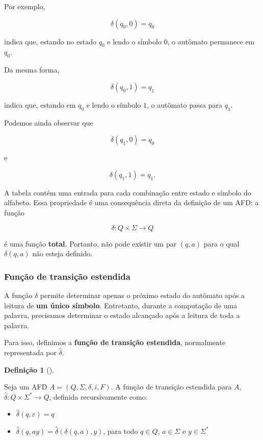 \documentclass[
  brazilian,
  letterpaper,
]{book}
\theoremstyle{plain}
\theoremstyle{definition}
\newtheorem{definition}{Definição}[chapter]
\theoremstyle{remark}
\begin{document}
Por exemplo,

\[
\delta(q_0,0)=q_0
\]

indica que, estando no estado \(q_0\) e lendo o símbolo \(0\), o
autômato permanece em \(q_0\).

Da mesma forma,

\[
\delta(q_0,1)=q_1
\]

indica que, estando em \(q_0\) e lendo o símbolo \(1\), o autômato passa
para \(q_1\).

Podemos ainda observar que

\[
\delta(q_1,0)=q_0
\]

e

\[
\delta(q_1,1)=q_1.
\]

A tabela contém uma entrada para cada combinação entre estado e símbolo
do alfabeto. Essa propriedade é uma consequência direta da definição de
um AFD: a função

\[
\delta:Q\times\Sigma\rightarrow Q
\]

é uma função \textbf{total}. Portanto, não pode existir um par \((q,a)\)
para o qual \(\delta(q,a)\) não esteja definido.

\subsubsection{Função de transição
estendida}\label{funuxe7uxe3o-de-transiuxe7uxe3o-estendida}

A função \(\delta\) permite determinar apenas o próximo estado do
autômato após a leitura de \textbf{um único símbolo}. Entretanto,
durante a computação de uma palavra, precisamos determinar o estado
alcançado após a leitura de toda a palavra.

Para isso, definimos a \textbf{função de transição estendida},
normalmente representada por \(\hat{\delta}\).

\begin{definition}[]\protect\hypertarget{def-transicao-estendida}{}\label{def-transicao-estendida}

Seja um AFD \(A = (Q,\Sigma,\delta,i,F)\). A função de transição
estendida para \(A\),
\(\hat{\delta} : Q \times \Sigma^* \rightarrow Q\), definida
recursivamente como:

\begin{itemize}
\item
  \(\hat{\delta}(q,\varepsilon) = q\)
\item
  \(\hat{\delta}(q,ay) = \hat{\delta}(\delta(q,a),y)\), para todo
  \(q \in Q\), \(a \in \Sigma\) e \(y \in \Sigma^*\)
\end{itemize}

\end{definition}
\end{document}
